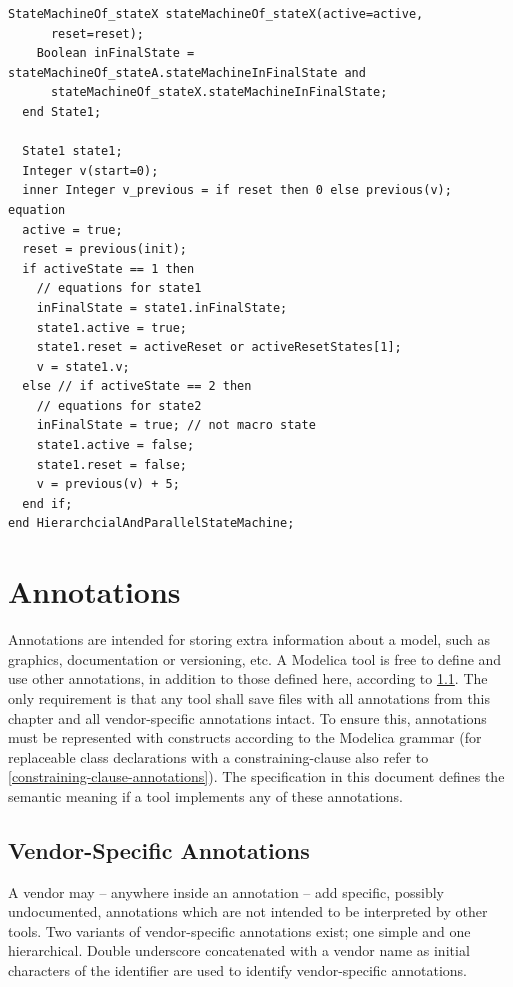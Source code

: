 \documentclass[10pt,a4paper]{report}
\def\doublelabel#1{\label{#1}}
\begin{document}
\begin{lstlisting}[language=modelica]
    StateMachineOf_stateX stateMachineOf_stateX(active=active,
      reset=reset);
    Boolean inFinalState = stateMachineOf_stateA.stateMachineInFinalState and
      stateMachineOf_stateX.stateMachineInFinalState;
  end State1;

  State1 state1;
  Integer v(start=0);
  inner Integer v_previous = if reset then 0 else previous(v);
equation
  active = true;
  reset = previous(init);
  if activeState == 1 then
    // equations for state1
    inFinalState = state1.inFinalState;
    state1.active = true;
    state1.reset = activeReset or activeResetStates[1];
    v = state1.v;
  else // if activeState == 2 then
    // equations for state2
    inFinalState = true; // not macro state
    state1.active = false;
    state1.reset = false;
    v = previous(v) + 5;
  end if;
end HierarchcialAndParallelStateMachine;
\end{lstlisting}
\chapter{Annotations}\doublelabel{annotations}

Annotations are intended for storing extra information about a model,
such as graphics, documentation or versioning, etc. A Modelica tool is
free to define and use other annotations, in addition to those defined
here, according to \ref{vendor-specific-annotations}. The only requirement is that any tool
shall save files with all annotations from this chapter and all
vendor-specific annotations intact. To ensure this, annotations must be
represented with constructs according to the Modelica grammar (for
replaceable class declarations with a constraining-clause also refer to
\ref{constraining-clause-annotations}). The specification in this document defines the
semantic meaning if a tool implements any of these annotations.

\section{Vendor-Specific Annotations}\doublelabel{vendor-specific-annotations}

A vendor may -- anywhere inside an annotation -- add specific, possibly
undocumented, annotations which are not intended to be interpreted by
other tools. Two variants of vendor-specific annotations exist; one
simple and one hierarchical. Double underscore concatenated with a
vendor name as initial characters of the identifier are used to identify
vendor-specific annotations.
\end{document}
